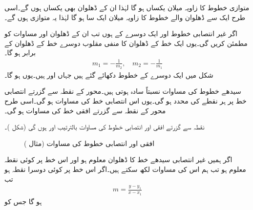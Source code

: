 متوازی خطوط کا زاویہ میلان یکساں  ہو گا لہٰذا  ان  کے  ڈھلوان بھی  یکساں ہوں گے۔اسی طرح ایک  سے ڈھلوان والے خطوط کا زاویہ میلان ایک  سا  ہو گا لہٰذا یہ متوازی ہوں گے۔

اگر غیر انتصابی خطوط  اور    ایک دوسرے کے     ہوں تب ان کے ڈھلوان  اور  مساوات  کو مطمئن کریں گی۔یوں ایک خط کے ڈھلوان کا منفی مقلوب   دوسرے خط کے ڈھلوان کے برابر ہو گا۔
\begin{align*}
m_1=-\frac{1}{m_2},\quad m_2=-\frac{1}{m_1}
\end{align*}
شکل  میں ایک دوسرے کے     خطوط دکھائے گئے ہیں جہاں    اور  ہیں۔یوں  ہو گا۔

سیدھے خطوط کی مساوات نسبتاً سادہ ہوتی ہیں۔محور  کے نقطہ  سے گزرتے انتصابی خط پر ہر نقطے کی  محدد  ہو گی۔یوں اس انتصابی خط کی مساوات  ہو گی۔اسی طرح محور  کے نقطہ  سے گزرتے افقی خط کی مساوات  ہو گی۔

نقطہ  سے گزرتے افقی اور انتصابی خطوط کی  مساوات بالترتیب  اور  ہوں گی (شکل )۔
\begin{figure}
\centering
{}
\caption{افقی اور انتصابی خطوط کی مساوات (مثال )}
\label{شکل_مثال_ابتدا_افقی_انتصابی_مساوات}
\end{figure}

اگر ہمیں غیر انتصابی سیدھے خط  کا ڈھلوان معلوم ہو اور اس خط پر کوئی نقطہ  معلوم ہو تب ہم اس کی مساوات لکھ سکتے ہیں۔اگر اس خط پر  کوئی دوسرا نقطہ ہو تب
\begin{align*}
m=\frac{y-y_1}{x-x_1}
\end{align*}
ہو گا جس کو

